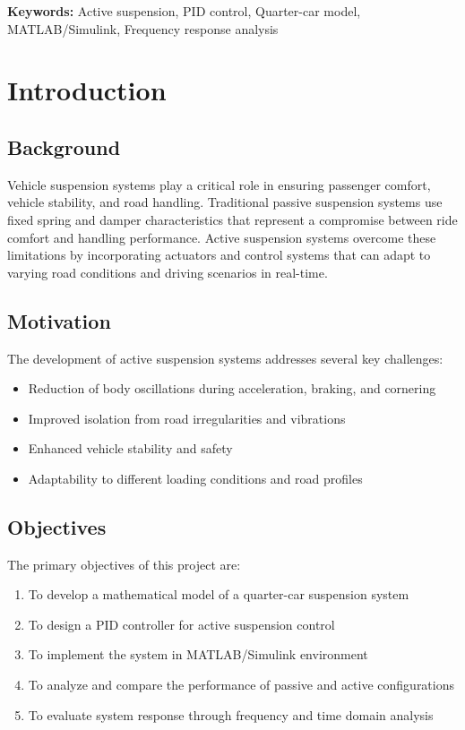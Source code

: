 \documentclass[12pt,a4paper]{article}
\begin{document}
\textbf{Keywords:} Active suspension, PID control, Quarter-car model, MATLAB/Simulink, Frequency response analysis

\newpage
\tableofcontents

\newpage
\listoffigures

\listoftables

\newpage
\section{Introduction}

\subsection{Background}
Vehicle suspension systems play a critical role in ensuring passenger comfort, vehicle stability, and road handling. Traditional passive suspension systems use fixed spring and damper characteristics that represent a compromise between ride comfort and handling performance. Active suspension systems overcome these limitations by incorporating actuators and control systems that can adapt to varying road conditions and driving scenarios in real-time.

\subsection{Motivation}
The development of active suspension systems addresses several key challenges:
\begin{itemize}
    \item Reduction of body oscillations during acceleration, braking, and cornering
    \item Improved isolation from road irregularities and vibrations
    \item Enhanced vehicle stability and safety
    \item Adaptability to different loading conditions and road profiles
\end{itemize}

\subsection{Objectives}
The primary objectives of this project are:
\begin{enumerate}
    \item To develop a mathematical model of a quarter-car suspension system
    \item To design a PID controller for active suspension control
    \item To implement the system in MATLAB/Simulink environment
    \item To analyze and compare the performance of passive and active configurations
    \item To evaluate system response through frequency and time domain analysis
\end{enumerate}
\end{document}
